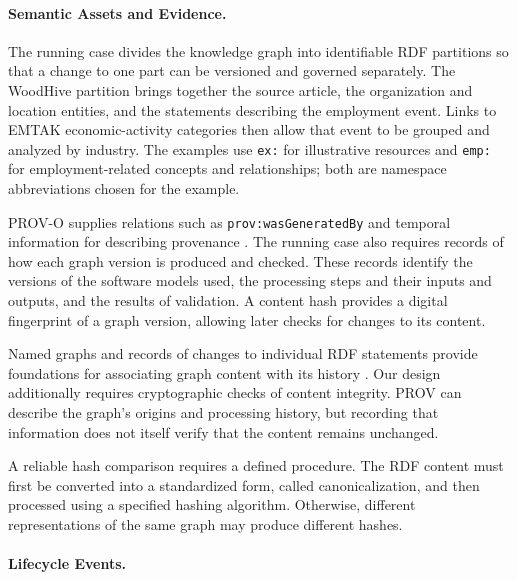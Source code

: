 \documentclass[journal]{IEEEtran}
\begin{document}
\paragraph{Semantic Assets and Evidence.}

The running case divides the knowledge graph into identifiable RDF
partitions so that a change to one part can be versioned and governed
separately. The WoodHive partition brings together the source article,
the organization and location entities, and the statements describing
the employment event. Links to EMTAK economic-activity categories then
allow that event to be grouped and analyzed by industry. The examples
use \texttt{ex:} for illustrative resources and \texttt{emp:} for
employment-related concepts and relationships; both are namespace
abbreviations chosen for the example.

PROV-O supplies relations such as \texttt{prov:wasGeneratedBy}
and temporal information for describing provenance
\cite{Moreau2013PROV,Lebo2013PROVO}.
The running case also requires records of how each graph
version is produced and checked. These records identify the
versions of the software models used, the processing steps
and their inputs and outputs, and the results of validation.
A content hash provides a digital fingerprint of a graph
version, allowing later checks for changes to its content.

Named graphs and records of changes to individual RDF
statements provide foundations for associating graph content
with its history
\cite{Carroll2005NamedGraphs,Dibowski2024TraceabilityKG}.
Our design additionally requires cryptographic checks of
content integrity. PROV can describe the graph's origins and
processing history, but recording that information does not
itself verify that the content remains unchanged.

A reliable hash comparison requires a defined procedure.
The RDF content must first be converted into a standardized
form, called canonicalization, and then processed using a
specified hashing algorithm. Otherwise, different
representations of the same graph may produce different
hashes.

\paragraph{Lifecycle Events.}
\end{document}
